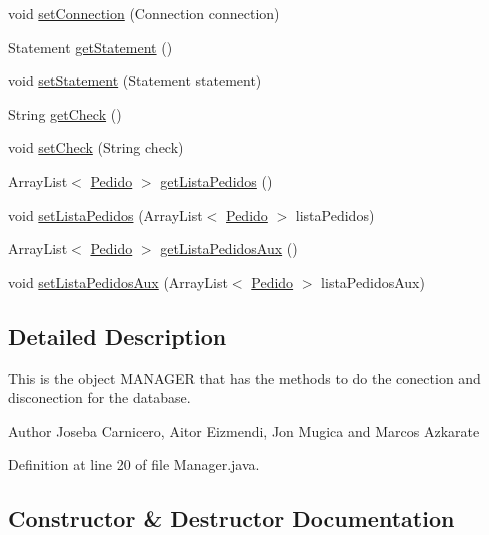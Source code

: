 \begin{DoxyCompactItemize}
\item 
void \mbox{\hyperlink{classsimulator_1_1_manager_adc747823ff8f856a79a78a30ae6788f9}{set\+Connection}} (Connection connection)
\item 
Statement \mbox{\hyperlink{classsimulator_1_1_manager_ad753f8ec42bb1b7a2d5c3b0a5ff7ed99}{get\+Statement}} ()
\item 
void \mbox{\hyperlink{classsimulator_1_1_manager_ab4d473d9764b3aab34e02cc10a1e9645}{set\+Statement}} (Statement statement)
\item 
String \mbox{\hyperlink{classsimulator_1_1_manager_a74a372ec99052be3ceced43baeedbeac}{get\+Check}} ()
\item 
void \mbox{\hyperlink{classsimulator_1_1_manager_aaaf1f38ecbe1e8d2ca7ad20081ab378a}{set\+Check}} (String check)
\item 
Array\+List$<$ \mbox{\hyperlink{classsimulator_1_1_pedido}{Pedido}} $>$ \mbox{\hyperlink{classsimulator_1_1_manager_a98f04170b85509ae8f1fe2753dac60ef}{get\+Lista\+Pedidos}} ()
\item 
void \mbox{\hyperlink{classsimulator_1_1_manager_a3ac3fa3e9c1e559bbd50df24fe32fe33}{set\+Lista\+Pedidos}} (Array\+List$<$ \mbox{\hyperlink{classsimulator_1_1_pedido}{Pedido}} $>$ lista\+Pedidos)
\item 
Array\+List$<$ \mbox{\hyperlink{classsimulator_1_1_pedido}{Pedido}} $>$ \mbox{\hyperlink{classsimulator_1_1_manager_af266ad72ad536f9e58a75a3d070228cf}{get\+Lista\+Pedidos\+Aux}} ()
\item 
void \mbox{\hyperlink{classsimulator_1_1_manager_aa41c5e11ec1083566137aa868fea0049}{set\+Lista\+Pedidos\+Aux}} (Array\+List$<$ \mbox{\hyperlink{classsimulator_1_1_pedido}{Pedido}} $>$ lista\+Pedidos\+Aux)
\end{DoxyCompactItemize}


\subsection{Detailed Description}
This is the object M\+A\+N\+A\+G\+ER that has the methods to do the conection and disconection for the database.

\begin{DoxyAuthor}{Author}
Joseba Carnicero, Aitor Eizmendi, Jon Mugica and Marcos Azkarate 
\end{DoxyAuthor}


Definition at line 20 of file Manager.\+java.



\subsection{Constructor \& Destructor Documentation}
\mbox{\label{classsimulator_1_1_manager_af97cb12adc0ee7caa9e83f73ee85c04a}} 
